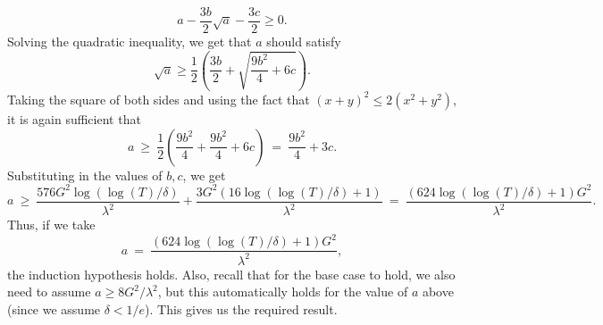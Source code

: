 \documentclass{article}
\begin{document}
\[
a-\frac{3b}{2}\sqrt{a}-\frac{3c}{2} \geq 0.
\]
Solving the quadratic inequality, we get that $a$ should satisfy
\[
\sqrt{a} \geq \frac{1}{2}\left(\frac{3b}{2}+\sqrt{\frac{9b^2}{4}+6c}\right).
\]
Taking the square of both sides and using the fact that $(x+y)^2 \leq 2(x^2+y^2)$, it is again sufficient that
\[
a ~\geq~ \frac{1}{2}\left(\frac{9b^2}{4}+\frac{9b^2}{4}+6c\right)
~=~ \frac{9b^2}{4}+3c.
\]
Substituting in the values of $b,c$, we get 
\[
a ~\geq~ \frac{576 G^2\log(\log(T)/\delta)}{\lambda^2}+\frac{3G^2(16\log(\log(T)/\delta)+1)}{\lambda^2}
~=~ \frac{(624\log(\log(T)/\delta)+1)G^2}{\lambda^2}.
\]
Thus, if we take
\[
a ~=~ \frac{(624\log(\log(T)/\delta)+1)G^2}{\lambda^2},
\]
the induction hypothesis holds. Also, recall that for the base case to hold, we also need to assume $a\geq 8G^2/\lambda^2$, but this automatically holds for the value of $a$ above (since we assume $\delta< 1/e$). This gives us the required result.
\end{document}
